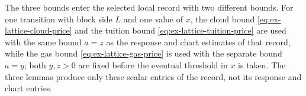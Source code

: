 The three bounds enter the selected local record with two different
bounds. For one transition with block side \(L\) and one value of \(x\),
the cloud bound \eqref{eq:ex-lattice-cloud-price} and the tuition bound \eqref{eq:ex-lattice-tuition-price} are used with the same bound
\(a=z\) as the response and chart estimates of that record, while the gas
bound \eqref{eq:ex-lattice-gas-price} is used with the separate bound \(a=y\); both \(y,z>0\) are
fixed before the eventual threshold in \(x\) is taken. The three lemmas
produce only these scalar entries of the record, not its response and chart
entries.
